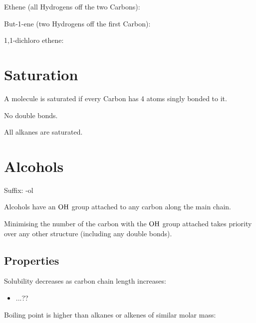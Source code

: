 \documentclass[a4paper,11pt]{article}
\begin{document}
Ethene (all Hydrogens off the two Carbons):

\begin{center}
\end{center}

But-1-ene (two Hydrogens off the first Carbon):

\begin{center}
\end{center}

1,1-dichloro ethene:

\begin{center}
\end{center}




\section{Saturation}

A molecule is saturated if every Carbon has 4 atoms singly bonded to it.

No double bonds.

All alkanes are saturated.



\section{Alcohols}

Suffix: -ol

Alcohols have an $\ce{OH}$ group attached to any carbon along the main chain.

Minimising the number of the carbon with the $\ce{OH}$ group attached takes
priority over any other structure (including any double bonds).


\subsection{Properties}

Solubility decreases as carbon chain length increases:

\begin{itemize}
\item ...??
\end{itemize}

Boiling point is higher than alkanes or alkenes of similar molar mass:
\end{document}
